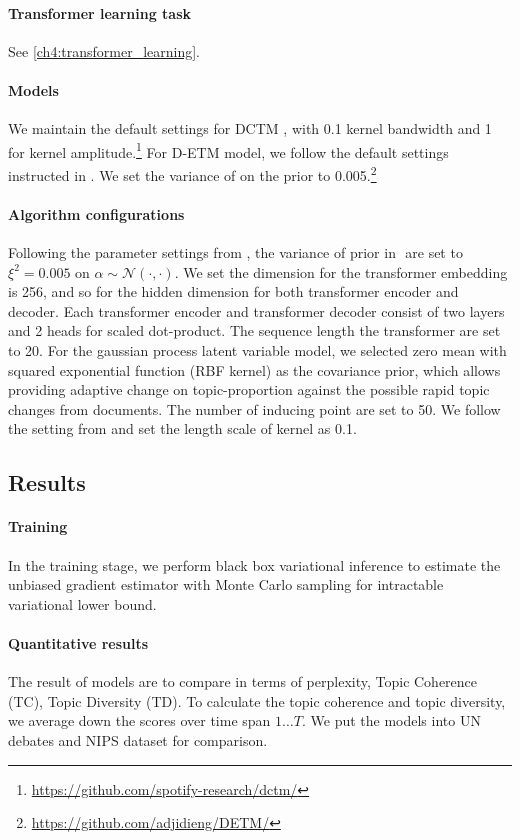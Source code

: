 \paragraph{Transformer learning task} See \ref{ch4:transformer_learning}.
\paragraph{Models}
We maintain the default settings for DCTM \cite{tomasi_stochastic_2020}, with 0.1 kernel bandwidth and 1 for kernel amplitude.\footnote{\url{https://github.com/spotify-research/dctm/}}
For D-ETM model, we follow the default settings instructed in \cite{dieng_dynamic_2019}. We set the variance of  on the prior to 0.005.\footnote{\url{https://github.com/adjidieng/DETM/}}
\paragraph{Algorithm configurations}
Following the parameter settings from \cite{blei_dynamic_2006}, the variance of prior in $  $ are set to $ \xi^2=0.005 $ on $ \alpha\sim\mathcal{N}(\cdot,\cdot) $.
We set the dimension for the transformer embedding is 256, and so for the hidden dimension for both transformer encoder and decoder. Each transformer encoder and transformer decoder consist of two layers and 2 heads for scaled dot-product. The sequence length the transformer are set to 20.
For the gaussian process latent variable model, we selected zero mean with squared exponential function (RBF kernel) as the covariance prior, which allows providing adaptive change on topic-proportion against the possible rapid topic changes from documents. The number of inducing point are set to 50. We follow the setting from \cite{tomasi_stochastic_2020} and set the length scale of kernel as 0.1.
\subsection{Results}
\paragraph{Training}
In the training stage, we perform black box variational inference to estimate the unbiased gradient estimator with Monte Carlo sampling for intractable variational lower bound.
\paragraph{Quantitative results}
The result of models are to compare in terms of perplexity, Topic Coherence (TC), Topic Diversity (TD). To calculate the topic coherence and topic diversity, we average down the scores over time span $ 1\dots T $. We put the models into UN debates and NIPS dataset for comparison.

